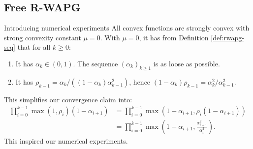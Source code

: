 \documentclass[11pt]{beamer}
\theoremstyle{definition}
\begin{document}
    \subsection{Free R-WAPG}
        \begin{frame}{Introducing numerical experiments}
            All convex functions are strongly convex with strong convexity constant $\mu = 0$. 
            With $\mu = 0$, it has from Definition \ref{def:rwapg-seq} that for all $k \ge 0$: 
            \begin{enumerate}
                \item It has $\alpha_k \in (0, 1)$. The sequence $(\alpha_k)_{k \ge 1}$ is as loose as possible. 
                \item It has $\rho_{k - 1} = \alpha_k/((1 - \alpha_k)\alpha_{k - 1}^2)$, hence $(1 - \alpha_k)\rho_{k - 1} = \alpha_k^2/\alpha_{k - 1}^2$. 
            \end{enumerate}
            This simplifies our convergence claim into: 
            \begin{align*}
                \prod_{i = 0}^{k - 1}
                \max(1, \rho_i)(1 - \alpha_{i + 1})
                &= 
                \prod_{i = 0}^{k - 1}
                \max(1 - \alpha_{i + 1}, \rho_i(1 - \alpha_{i + 1}))
                \\
                &= 
                \prod_{i = 0}^{k - 1}
                \max\left(
                1 - \alpha_{i + 1}, \frac{\alpha_{i + 1}^2}{\alpha_i^2}\right). 
            \end{align*}
            This inspired our numerical experiments. 
        \end{frame}
\end{document}
